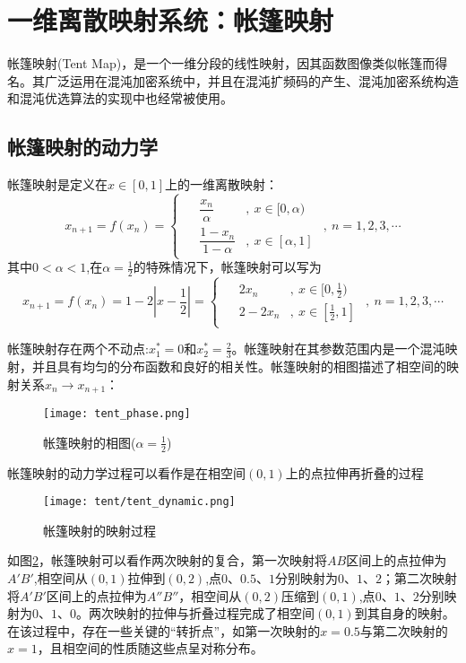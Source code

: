 \section{一维离散映射系统：帐篷映射}
帐篷映射(Tent Map)，是一个一维分段的线性映射，因其函数图像类似帐篷而得名。其广泛运用在混沌加密系统中，并且在混沌扩频码的产生、混沌加密系统构造和混沌优选算法的实现中也经常被使用。

\subsection{帐篷映射的动力学}

帐篷映射是定义在$x\in [0,1]$上的一维离散映射：
\begin{equation}
    x_{n+1}=f(x_n)=
    \begin{cases}
        \begin{aligned}
            &\dfrac{x_n}{\alpha}&,\ x\in [0,\alpha)\\
            &\dfrac{1-x_n}{1-\alpha}&,\ x\in [\alpha,1]
        \end{aligned}
    \end{cases},\ n=1,2,3,\cdots
\end{equation}
其中$0<\alpha<1$,在$\alpha=\frac{1}{2}$的特殊情况下，帐篷映射可以写为
\begin{equation}
    x_{n+1}=f(x_n)=1-2|x-\frac{1}{2}|=
    \begin{cases}
        \begin{aligned}
            &2x_n&,\ x\in [0,\frac{1}{2})\\
            &2-2x_n&,\ x\in [\frac{1}{2},1]
        \end{aligned}
    \end{cases},\ n=1,2,3,\cdots
\end{equation}

帐篷映射存在两个不动点:$x_1^*=0$和$x_2^*=\frac{2}{3}$。帐篷映射在其参数范围内是一个混沌映射，并且具有均匀的分布函数和良好的相关性。帐篷映射的相图描述了相空间的映射关系$x_n\rightarrow x_{n+1}$：
\begin{figure}
	\centering
	\texttt{[image: tent\_phase.png]}
    \caption{帐篷映射的相图($\alpha=\frac{1}{2}$)}
    \label{fig:tent_pha}
\end{figure}

帐篷映射的动力学过程可以看作是在相空间$(0,1)$上的点拉伸再折叠的过程
\begin{figure}
	\centering
	\texttt{[image: tent/tent\_dynamic.png]}
    \caption{帐篷映射的映射过程}
    \label{fig:tent_dyna}
\end{figure}
如图\ref{fig:tent_dyna}，帐篷映射可以看作两次映射的复合，第一次映射将$AB$区间上的点拉伸为$A'B'$,相空间从$(0,1)$拉伸到$(0,2)$,点$0$、$0.5$、$1$分别映射为$0$、$1$、$2$；第二次映射将$A'B'$区间上的点拉伸为$A''B''$，相空间从$(0,2)$压缩到$(0,1)$,点$0$、$1$、$2$分别映射为$0$、$1$、$0$。两次映射的拉伸与折叠过程完成了相空间$(0,1)$到其自身的映射。在该过程中，存在一些关键的“转折点”，如第一次映射的$x=0.5$与第二次映射的$x=1$，且相空间的性质随这些点呈对称分布。

